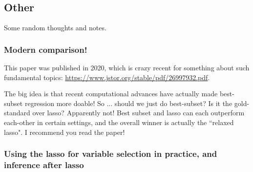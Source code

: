 %

\subsection{Other}

Some random thoughts and notes. 

\subsubsection{Modern comparison!}

This paper was published in 2020, which is crazy recent for something about such fundamental topics:
\url{https://www.jstor.org/stable/pdf/26997932.pdf}. 

The big idea is that recent computational advances have actually made best-subset regression more doable! So ... should we just do best-subset? Is it the gold-standard over lasso? Apparently not! Best subset and lasso can each outperform each-other in certain settings, and the overall winner is actually the ``relaxed lasso". I recommend you read the paper!

\subsubsection{Using the lasso for variable selection in practice, and inference after lasso}

